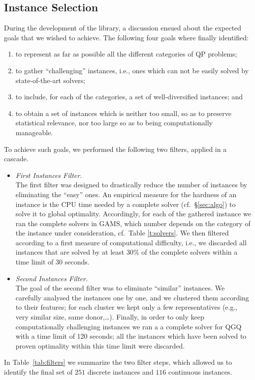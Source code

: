 \subsection{Instance Selection}\label{subsec:selection}

During the development of the library, a discussion ensued about
the expected goals that we wished to achieve. The following four goals
where finally identified:
%
\begin{enumerate}
 \item to represent as far as possible all the different categories of QP
       problems;
 \item to gather ``challenging'' instances, i.e., ones which can not be easily
       solved by  state-of-the-art solvers;
 \item to include, for each of the categories, a set of well-diversified
       instances; and
 \item to obtain a set of instances which is neither too small, so as to
       preserve statistical relevance, nor too large so as to being
       computationally manageable.
\end{enumerate}
%
To achieve such goals, we performed the following two filters, applied in
a cascade.
%
\begin{itemize}
 \item \emph{First Instances Filter.}\\
       The first filter was designed to drastically reduce the number of
       instances by eliminating the ``easy'' ones. An empirical measure
       for the hardness of an instance is the CPU time needed by a
       complete solver (cf.~\S\ref{sec:algo}) to solve it to
       global optimality. Accordingly, for each of the gathered instance we
       ran the complete solvers in GAMS, which number depends on the category
       of the instance under consideration, cf.~Table \ref{t:solvers}.
       We then filtered according to a first
       measure of computational difficulty, i.e., we discarded all instances
       that are solved by at least 30\% of the complete solvers within a time
       limit of 30 seconds.
 \item \emph{Second Instances Filter.}\\
       The goal of the second filter was to eliminate ``similar'' instances.
       We carefully analysed the instances one by one, and we clustered them
       according to their features; for each cluster we kept only a few
       representatives (e.g., very similar size, same donor,\ldots). Finally, in order to only
       keep computationally challenging instances we ran a a complete solver for QGQ with a time limit of 120 seconds; all the
       instances which have been solved to proven optimality within this time limit
       were discarded.
\end{itemize}
%
In Table~\ref{tab:filters} we summarize the two filter steps, which
allowed us to identify the final set of $251$ discrete instances and
$116$ continuous instances.

